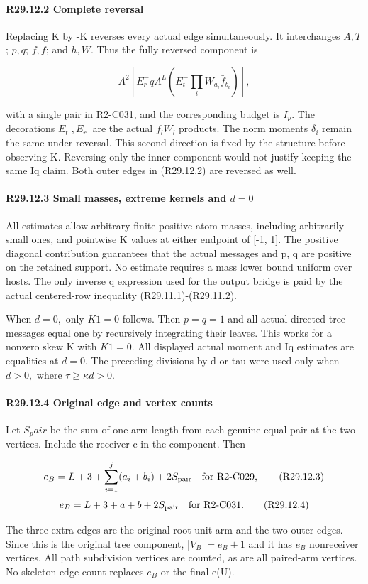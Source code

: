 \paragraph{R29.12.2 Complete reversal}

Replacing K by -K reverses every actual edge simultaneously. It
interchanges $A,T$; $p,q$; $f,\bar f$; and $h,W$. Thus the fully reversed
component is

\[
A^2\left[E_r^-qA^L\left(E_t^-\prod_iW_{a_i}\bar f_{b_i}\right)\right],
\tag{R29.12.2}
\]

with a single pair in R2-C031, and the corresponding budget is \(I_p.\)
The decorations \(E_t^-,\allowbreak  E_r^-\) are the actual \(\bar f_lW_l\) products.
The norm moments \(\delta_i\) remain the same under reversal.
This second direction is fixed by the structure before observing K. Reversing only the inner component
would not justify keeping the same Iq claim. Both outer edges in
(R29.12.2) are reversed as well.

\paragraph{R29.12.3 Small masses, extreme kernels and \(d=0\)}

All estimates allow arbitrary finite positive atom masses, including
arbitrarily small ones, and pointwise K values at either endpoint
of [-1, 1]. The positive diagonal contribution guarantees that the
actual messages and p, q are positive on the retained support.
No estimate requires a mass lower bound uniform over hosts.
The only inverse q expression used for the output bridge is paid
by the actual centered-row inequality (R29.11.1)-(R29.11.2).

When \(d=0,\allowbreak \) only \(K1=0\) follows. Then \(p=q=1\) and all actual directed
tree messages equal one by recursively integrating their leaves.
This works for a nonzero skew K with \(K1=0.\) All displayed actual
moment and Iq estimates are equalities at \(d=0.\) The preceding
divisions by d or tau were used only when \(d>0,\allowbreak \) where
\(\tau\ge \kappa d>0.\) 

\paragraph{R29.12.4 Original edge and vertex counts}

Let \(S_pair\) be the sum of one arm length from each genuine equal pair
at the two vertices. Include the receiver c in the component. Then

\[
e_B=L+3+\sum_{i=1}^j(a_i+b_i)+2S_{\rm pair}
\quad\text{for R2-C029},
\tag{R29.12.3}
\]
\[
e_B=L+3+a+b+2S_{\rm pair}
\quad\text{for R2-C031}.
\tag{R29.12.4}
\]

The three extra edges are the original root unit arm and the two
outer edges. Since this is the original tree component,
|\(V_B|=e_B+1\) and it has \(e_B\) nonreceiver vertices.
All path subdivision vertices are counted, as are all paired-arm
vertices. No skeleton edge count replaces \(e_B\) or the final e(U).
